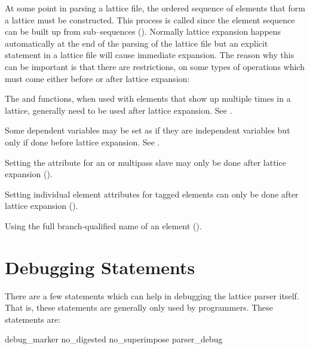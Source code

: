 {At some point in parsing a lattice file, the ordered sequence of
elements that form a lattice must be constructed. This process is called
 since the element sequence can be built up from
sub--sequences (). Normally lattice expansion happens
automatically at the end of the parsing of the lattice file but an
explicit  statement in a lattice file will cause
immediate expansion. The reason why this can be important is that there
are restrictions, on some types of operations which must come either
before or after lattice expansion:
\begin{Itemize}
\item 
{}
The  and  functions, when used with elements
that show up multiple times in a lattice, generally need to be used
after lattice expansion. See .
\item 
Some dependent variables may be set as if they are independent
variables but only if done before lattice expansion. See .
\item 
Setting the  attribute for an 
 or  multipass
slave may only be done after lattice expansion ().
\item
{}
Setting individual element attributes for tagged elements can only be done
after lattice expansion ().
\item
{}
Using the full branch-qualified name of an element ().
\end{Itemize}

\section{Debugging Statements}
\label{s:debug}

There are a few statements
which can help in debugging the \bmad lattice parser
itself. That is, these statements are generally only used by programmers.
These statements are:
\begin{example}
  debug_marker
  no_digested
  no_superimpose
  parser_debug
\end{example}

}
